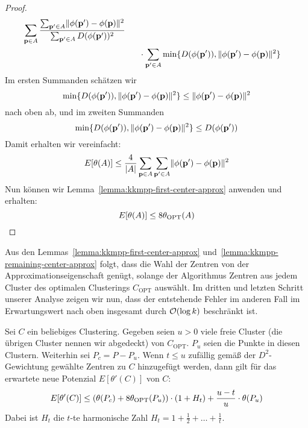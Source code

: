 \begin{proof}
\begin{align*}
							\sum_{\mathbf{p} \in A} \frac{\sum_{\mathbf{p}' \in A} \lVert {\phi(\ensuremath{\mathbf{p}}')} - {\phi(\mathbf{p})} \rVert^2}{\sum_{\mathbf{p}' \in A} D(\phi(\mathbf{p}'))^2} \\
						& \; \; \; \; \; \; \cdot \sum_{\mathbf{p}' \in A} \min \{ D(\phi(\mathbf{p}')), \lVert {\phi(\ensuremath{\mathbf{p}}')} - {\phi(\mathbf{p})} \rVert^2 \}
	\end{align*}
	Im ersten Summanden schätzen wir
	\[ \min \{ D(\phi(\mathbf{p}')), \lVert {\phi(\ensuremath{\mathbf{p}}')} - {\phi(\mathbf{p})} \rVert^2 \} \leq \lVert {\phi(\ensuremath{\mathbf{p}}')} - {\phi(\mathbf{p})} \rVert^2 \]
	nach oben ab, und im zweiten Summanden
	\[ \min \{ D(\phi(\mathbf{p}')), \lVert {\phi(\ensuremath{\mathbf{p}}')} - {\phi(\mathbf{p})} \rVert^2 \} \leq D(\phi(\mathbf{p}')) \]
	Damit erhalten wir vereinfacht:
	\[ E[\theta(A)] \leq \frac{4}{\left|A\right|} \sum_{\mathbf{p} \in A} \sum_{\mathbf{p}' \in A} \lVert {\phi(\ensuremath{\mathbf{p}}')} - {\phi(\mathbf{p})} \rVert^2 \]
	Nun können wir Lemma~\ref{lemma:kkmpp-first-center-approx} anwenden und erhalten:
	\[ E[\theta(A)] \leq 8 \theta_{\textrm{OPT}}(A) \]
\end{proof}
Aus den Lemmas~\ref{lemma:kkmpp-first-center-approx} und~\ref{lemma:kkmpp-remaining-center-approx} folgt, dass
die Wahl der Zentren von \kkmpp{} der Approximationseigenschaft genügt, solange der Algorithmus Zentren aus jedem Cluster
des optimalen Clusterings $C_\textrm{OPT}$ auswählt. Im dritten und letzten Schritt unserer Analyse zeigen wir nun,
dass der entstehende Fehler im anderen Fall im Erwartungswert nach oben insgesamt durch $\mathcal{O}(\log k)$ beschränkt ist.

\begin{lemma}
\label{lemma:kkmpp-error}
	Sei $C$ ein beliebiges Clustering. Gegeben seien $u > 0$ viele freie Cluster (die übrigen Cluster nennen wir abgedeckt)
	von $C_\textrm{OPT}$. $P_u$ seien die Punkte in
	diesen Clustern. Weiterhin sei $P_c = P - P_u$. Wenn $t \leq u$ zufällig gemäß der $D^2$-Gewichtung gewählte Zentren zu
	$C$ hinzugefügt werden, dann gilt für das erwartete neue Potenzial $E[\theta'(C)]$ von $C$:
	\[ E[\theta'(C)] \leq \left( \theta(P_c) + 8 \theta_{\textrm{OPT}}(P_u) \right) \cdot (1 + H_t) + \frac{u-t}{u} \cdot \theta(P_u) \]
	Dabei ist $H_t$ die $t$-te harmonische Zahl $H_t = 1 + \frac{1}{2} + \dots + \frac{1}{t}$.
\end{lemma}

